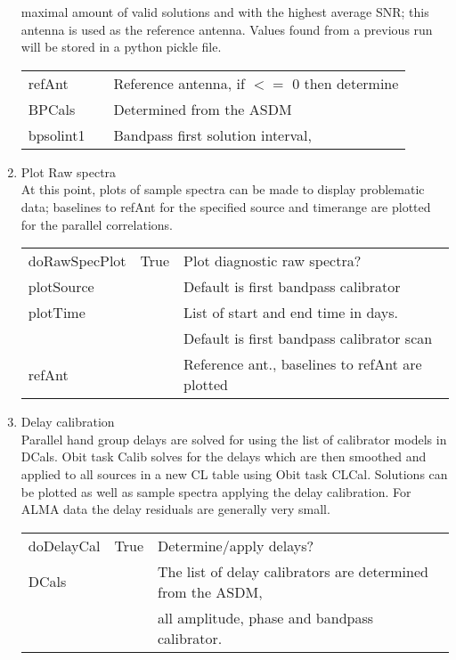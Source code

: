 \documentclass[11pt]{article}
\begin{document}
\begin{enumerate}
maximal amount of valid solutions and with the highest average SNR;
this antenna is used as the reference antenna.
Values found from a previous run will be stored in a python pickle file.
\begin{center}
\begin{tabular}{|l|c|l|}
\hline
refAnt  &  & Reference antenna, if $<=$ 0 then determine \\
 BPCals &  & Determined from the ASDM \\
 bpsolint1 &  &  Bandpass first solution interval, \\
\hline
\end{tabular}
\end{center}
%
\item Plot Raw spectra \label{rawplot}\\
At this point, plots of sample spectra can be made to display
problematic data; baselines to refAnt for the specified 
source and timerange are plotted for the parallel correlations.
\begin{center}
\begin{tabular}{|l|c|l|}
\hline
doRawSpecPlot  & True &  Plot diagnostic raw spectra?\\
plotSource     & & Default is first bandpass calibrator\\
plotTime       & & List of start and end time in days.\\
  &  & Default is first bandpass calibrator scan\\
refAnt  &  & Reference ant., baselines to refAnt are plotted \\
\hline
\end{tabular}
\end{center}
\newpage
%
\item Delay calibration\\
Parallel hand group delays are solved for using the list of
calibrator models in DCals.
Obit task Calib solves for the delays which are then smoothed and
applied to all sources in a new CL table using Obit task CLCal.
Solutions can be plotted as well as sample spectra applying the delay
calibration.
For ALMA data the delay residuals are generally very small.
\begin{center}
\begin{tabular}{|l|c|l|}
\hline
doDelayCal  & True &  Determine/apply delays? \\
DCals  &  & The list of delay calibrators are determined from the ASDM, \\
  &  & all amplitude, phase and bandpass calibrator. \\

\end{tabular}
\end{center}
\end{enumerate}
\end{document}
